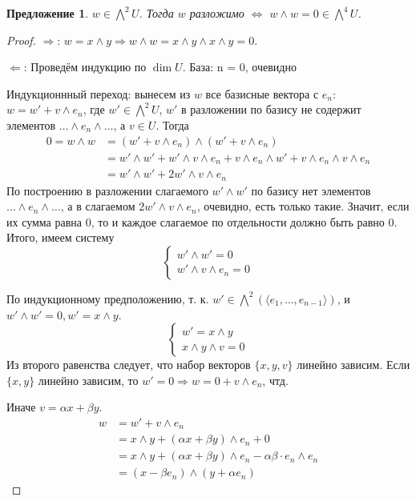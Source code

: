 \documentclass{article}
\newtheorem*{proposition}{Предложение}
\theoremstyle{definition}
\theoremstyle{remark}
\newcommand{\Ra}{\Rightarrow}
\newcommand{\La}{\Leftarrow}
\renewcommand{\iff}{\Leftrightarrow}
\begin{document}
\begin{proposition}
    $w \in \bigwedge^2 U$. Тогда $w$ разложимо $\iff$ $w \wedge w = 0 \in \bigwedge^4 U$.
\end{proposition}
\begin{proof}
    $\Ra$: $w = x \wedge y \Ra w \wedge w = x \wedge y \wedge x \wedge y = 0$.

    $\La$: Проведём индукцию по $\dim U$. База: n = 0, очевидно

    Индукционнный переход: вынесем из $w$ все базисные вектора с $e_n$: $w = w' + v \wedge e_n$, где $w' \in \bigwedge^2 U$, $w'$ в разложении по базису не содержит элементов $\hdots \wedge e_n \wedge \hdots$, а $v \in U$. Тогда
    \begin{align*}
        0 = w \wedge w &= (w' + v \wedge e_n) \wedge (w' + v \wedge e_n) \\ 
        &= w' \wedge w' + w' \wedge v \wedge e_n + v \wedge e_n \wedge w' + v \wedge e_n \wedge v \wedge e_n \\ 
        &= w' \wedge w' + 2 w' \wedge v \wedge e_n
    \end{align*}
    По построению в разложении слагаемого $w' \wedge w'$ по базису нет элементов $\hdots \wedge e_n \wedge \hdots$, а в слагаемом $2 w' \wedge v \wedge e_n$, очевидно, есть только такие. Значит, если их сумма равна 0, то и каждое слагаемое по отдельности должно быть равно 0. Итого, имеем систему
    \begin{equation*}
        \begin{cases}
            w' \wedge w' = 0 \\
            w' \wedge v \wedge e_n = 0
        \end{cases}
    \end{equation*}

    По индукционному предположению, т. к. $w' \in \bigwedge^2 (\langle e_1, \hdots, e_{n-1} \rangle)$, и $w' \wedge w' = 0, w' = x \wedge y$.
    \begin{equation*}
        \begin{cases}
            w' = x \wedge y \\
            x \wedge y \wedge v = 0
        \end{cases}
    \end{equation*}
    Из второго равенства следует, что набор векторов $\{x, y, v\}$ линейно зависим. Если $\{x, y\}$ линейно зависим, то $w' = 0 \Ra w = 0 + v \wedge e_n$, чтд. 
    
    Иначе $v = \alpha x + \beta y$.
    \begin{align*}
        w &= w' + v \wedge e_n \\
        &= x \wedge y + (\alpha x + \beta y) \wedge e_n + 0 \\
        &= x \wedge y + (\alpha x + \beta y) \wedge e_n - \alpha \beta \cdot e_n \wedge e_n \\
        &= (x - \beta e_n) \wedge (y + \alpha e_n)
    \end{align*}
\end{proof}
\end{document}
